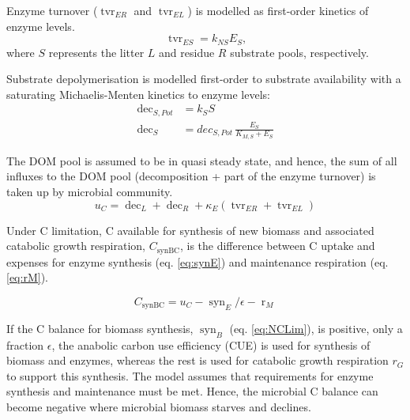Enzyme turnover ($\operatorname{tvr}_{ER}$ and $\operatorname{tvr}_{EL}$) is
modelled as first-order kinetics of enzyme levels.
\begin{equation}
\label{eq:tvrE}
\operatorname{tvr}_{ES} = k_{NS} E_S \text{,}
\end{equation}
where $S$ represents the litter $L$ and residue $R$ substrate pools, respectively.  

% 
Substrate depolymerisation is modelled first-order to substrate
availability with a saturating Michaelis-Menten kinetics to enzyme levels:
\begin{subequations}
\label{eq:dec}
\begin{align}
\operatorname{dec}_{S,Pot} &= k_S S
\\ 
\operatorname{dec}_S &= dec_{S,Pot} \, \frac{E_S}{K_{M,S} + E_S}
\end{align}
\end{subequations}
 
The DOM pool is assumed to be in quasi steady state, and hence, the sum of all
influxes to the DOM pool (decomposition + part of the enzyme turnover) is taken
up by microbial community.
\begin{equation}
\label{eq:uC}
u_C = \operatorname{dec}_L + \operatorname{dec}_R +  \kappa_E
(\operatorname{tvr}_{ER} + \operatorname{tvr}_{EL})
\end{equation}

Under C limitation, C available for synthesis of new biomass and
associated catabolic growth respiration, $C_{\operatorname{synBC}}$, is the
difference between C uptake and expenses for enzyme synthesis (eq.
\ref{eq:synE}) and maintenance respiration (eq.
\ref{eq:rM}).

\begin{equation}
\label{eq:synBC} 
C_{\operatorname{synBC}} = u_C -
\operatorname{syn}_E/\epsilon - \operatorname{r}_{M}
\end{equation}

If the C balance for biomass synthesis, $\operatorname{syn}_B$ (eq.
\ref{eq:NCLim}), is positive, only a fraction $\epsilon$, the anabolic
carbon use efficiency (CUE) is used for synthesis of biomass and enzymes,
whereas the rest is used for catabolic growth respiration $r_G$ to support this
synthesis.
The model assumes that requirements for enzyme synthesis and maintenance must be
met. Hence, the microbial C balance can become negative where microbial biomass starves
and declines.

